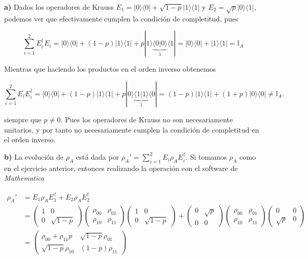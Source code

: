 \documentclass[12pt]{article}
\makeatletter
\theoremstyle{definition}\@ifundefined{exercise}{\newtheorem{exercise}{Ejercicio}}{}%
\makeatother
\begin{document}
\begin{exercise}
    \textbf{a)} Dados los operadores de Krauss $E_1 = |0\rangle\langle 0| + \sqrt{1-p}|1\rangle\langle 1|$ y $E_2 = \sqrt{p}|0\rangle\langle 1|$, podemos ver que efectivamente cumplen la condición de completitud, pues

$$\sum_{i=1}^2 E_i^\dagger E_i = |0\rangle\langle 0| + (1-p) |1\rangle\langle 1| + p|1\rangle\underbrace{\langle0|0\rangle}_{1}\langle1|= |0\rangle\langle0| + |1\rangle\langle1| = \mathbb{I}_A$$

Mientras que haciendo los productos en el orden inverso obtenemos

$$\sum_{i=1}^2 E_i E_i^\dagger = |0\rangle\langle 0| + (1-p) |1\rangle\langle 1| + p|0\rangle\underbrace{\langle1|1\rangle}_{1}\langle0|= (1-p)|1\rangle\langle1| + (1+p)|0\rangle\langle0| \neq \mathbb{I}_A.$$  

siempre que $p\neq 0$. Pues los operadores de Krauss no son necesariamente unitarios, y por tanto no necesariamente cumplen la condición de completitud en el orden inverso.

\textbf{b)} La evolución de $\rho_A$ está dada por $\rho_A' = \sum_{i=1}^2 E_i \rho_A E_i^\dagger$. Si tomamos $\rho_A$ como en el ejercicio anterior, entonces realizando la operación con el software de \textit{Mathematica}

\begin{align*}
    \rho_A' &= E_1 \rho_A E_1^\dagger + E_2 \rho_A E_2^\dagger \\
    &= \begin{pmatrix}
        1 & 0 \\
        0 & \sqrt{1-p}
    \end{pmatrix} \begin{pmatrix}
        \rho_{00} & \rho_{01} \\
        \rho_{10} & \rho_{11}
    \end{pmatrix} \begin{pmatrix}
        1 & 0 \\
        0 & \sqrt{1-p}
    \end{pmatrix} + 
    \begin{pmatrix}
        0 & \sqrt{p} \\
        0 & 0
    \end{pmatrix} 
    \begin{pmatrix}
        \rho_{00} & \rho_{01} \\
        \rho_{10} & \rho_{11}
    \end{pmatrix} 
    \begin{pmatrix}
        0 & 0\\
        \sqrt{p} & 0
    \end{pmatrix} \\[0.3cm]
    &= \begin{pmatrix}
        \rho_{00}+\rho_{11}p & \sqrt{1-p}\rho_{01} \\
        \sqrt{1-p}\rho_{10} & (1-p)\rho_{11}
    \end{pmatrix} 
\end{align*}


\end{exercise}
\end{document}
